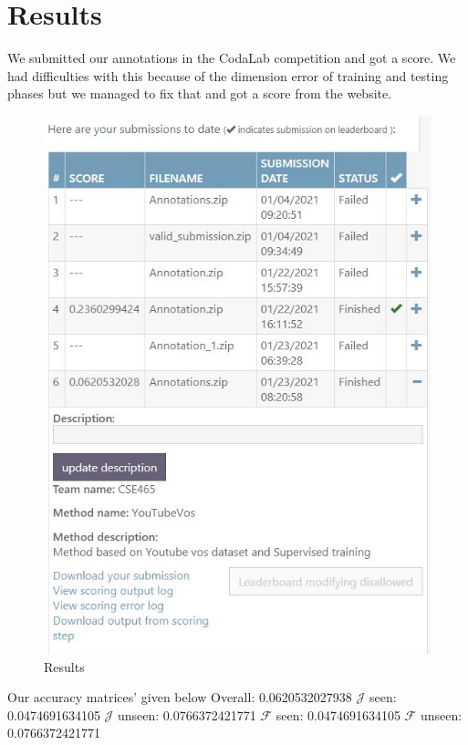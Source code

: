 \documentclass[conference]{IEEEtran}
\begin{document}
\section{Results}
We submitted our annotations in the CodaLab competition and got a score. We had difficulties with this because of the dimension error of training and testing phases but we managed to fix that and got a score from the website. 
\begin{figure}[h!]
\centering
\includegraphics[scale=.5]{codalab.JPG}
\caption{Results}
\label{fig:results}
\end{figure}
Our accuracy matrices' given below\newline
Overall: 0.0620532027938\newline
$\mathcal{J}$ seen: 0.0474691634105\newline
$\mathcal{J}$ unseen: 0.0766372421771\newline
$\mathcal{F}$ seen: 0.0474691634105\newline
$\mathcal{F}$ unseen: 0.0766372421771\newline
\end{document}
